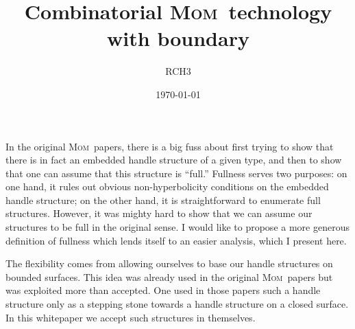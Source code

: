 \documentclass{article}
\theoremstyle{plain}
\theoremstyle{plain}
\theoremstyle{definition}
\numberwithin{equation}{section}
\newcommand{\MOM}{\textsc{Mom}}
\begin{document}
\title{Combinatorial \MOM\ technology with boundary}
\author{RCH3}
\date{\today}
\maketitle
In the original \MOM\ papers, there is a big
fuss about first trying to show that there is
in fact an embedded handle structure of a given
type, and then to show that one can assume that
this structure is ``full.'' Fullness serves two
purposes: on one hand, it rules out obvious
non-hyperbolicity conditions on the embedded
handle structure; on the other hand, it is
straightforward to enumerate full structures.
However, it was mighty hard to show that we can
assume our structures to be full in the original
sense. I would like to propose a more generous
definition of fullness which lends itself to an
easier analysis, which I present here.

The flexibility comes from allowing ourselves
to base our handle structures on bounded surfaces.
This idea was already used in the original \MOM\ papers
but was exploited more than accepted. One used in those
papers such a handle structure only as a stepping stone
towards a handle structure on a closed surface. In this
whitepaper we accept such structures in themselves.
\end{document}
